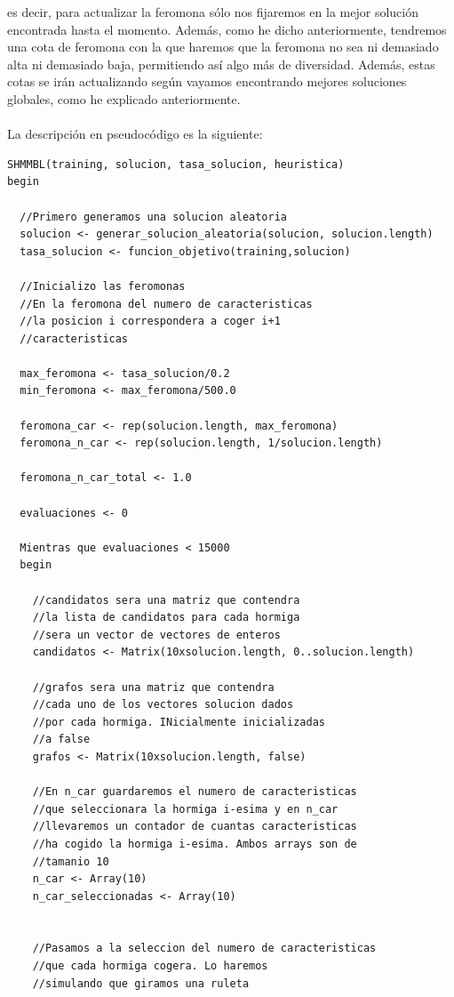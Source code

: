 es decir, para actualizar la feromona sólo nos fijaremos en la mejor solución encontrada hasta el momento. Además, como he dicho anteriormente, tendremos una cota de feromona con la que haremos que la feromona no sea ni demasiado alta ni demasiado baja, permitiendo así algo más de diversidad. Además, estas cotas se irán actualizando según vayamos encontrando mejores soluciones globales, como he explicado anteriormente.
\\
\\

La descripción en pseudocódigo es la siguiente:
\begin{lstlisting}
SHMMBL(training, solucion, tasa_solucion, heuristica)
begin

  //Primero generamos una solucion aleatoria
  solucion <- generar_solucion_aleatoria(solucion, solucion.length)
  tasa_solucion <- funcion_objetivo(training,solucion)
  
  //Inicializo las feromonas
  //En la feromona del numero de caracteristicas
  //la posicion i correspondera a coger i+1
  //caracteristicas
  
  max_feromona <- tasa_solucion/0.2
  min_feromona <- max_feromona/500.0
  
  feromona_car <- rep(solucion.length, max_feromona)
  feromona_n_car <- rep(solucion.length, 1/solucion.length)
  
  feromona_n_car_total <- 1.0
  
  evaluaciones <- 0
  
  Mientras que evaluaciones < 15000
  begin
  
    //candidatos sera una matriz que contendra
    //la lista de candidatos para cada hormiga
    //sera un vector de vectores de enteros
    candidatos <- Matrix(10xsolucion.length, 0..solucion.length)
  
    //grafos sera una matriz que contendra
    //cada uno de los vectores solucion dados
    //por cada hormiga. INicialmente inicializadas
    //a false
    grafos <- Matrix(10xsolucion.length, false)
   
    //En n_car guardaremos el numero de caracteristicas
    //que seleccionara la hormiga i-esima y en n_car
    //llevaremos un contador de cuantas caracteristicas
    //ha cogido la hormiga i-esima. Ambos arrays son de
    //tamanio 10
    n_car <- Array(10)
    n_car_seleccionadas <- Array(10)
  
  
    //Pasamos a la seleccion del numero de caracteristicas
    //que cada hormiga cogera. Lo haremos
    //simulando que giramos una ruleta
  

\end{lstlisting}
